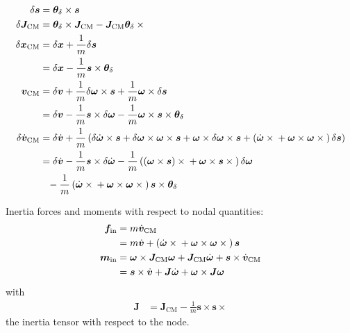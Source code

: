 \documentclass[10pt,fleqn,subeqn]{report}
\newcommand{\T}[1]{\bm{#1}}
\newcommand{\TT}[1]{\bm{#1}}
\begin{document}
\begin{subequations}
\begin{align}
	\delta\T{s}
		&= \T{\theta}_{\delta} \times \T{s} \\
	\delta \TT{J}_{\text{CM}}
		&= \T{\theta}_{\delta} \times \TT{J}_{\text{CM}}
		- \TT{J}_{\text{CM}} \T{\theta}_{\delta} \times{} \\
	\delta\T{x}_{\text{CM}}
		&= \delta\T{x} + \frac{1}{m} \delta\T{s}
		\nonumber \\
		&= \delta\T{x} - \frac{1}{m} \T{s} \times \T{\theta}_{\delta} \\
	\T{v}_{\text{CM}}
		&= \delta\T{v}
		+ \frac{1}{m} \delta\T{\omega} \times \T{s}
		+ \frac{1}{m} \T{\omega} \times \delta\T{s}
		\nonumber \\
		&= \delta\T{v}
		- \frac{1}{m} \T{s} \times \delta\T{\omega}
		- \frac{1}{m} \T{\omega} \times \T{s} \times \T{\theta}_{\delta} \\
	\delta\dot{\T{v}}_{\text{CM}}
		&= \delta\dot{\T{v}}
		+ \frac{1}{m}\plbr{
			\delta\dot{\T{\omega}}\times\T{s}
			+ \delta\T{\omega}\times\T{\omega}\times\T{s}
			+ \T{\omega}\times\delta\T{\omega}\times\T{s}
			+ \plbr{
				\dot{\T{\omega}}\times{}
				+ \T{\omega}\times\T{\omega}\times{}
			} \delta\T{s}
		}
		\nonumber \\
		&= \delta\dot{\T{v}}
			- \frac{1}{m} \T{s} \times \delta\dot{\T{\omega}}
			- \frac{1}{m} \plbr{
				\plbr{\T{\omega}\times\T{s}}\times{}
				+ \T{\omega}\times\T{s}\times{}
			} \delta\T{\omega}
		\nonumber \\ &\hphantom{=}
			- \frac{1}{m} \plbr{
				\dot{\T{\omega}}\times{}
				+ \T{\omega}\times\T{\omega}\times{}
			} \T{s}\times\T{\theta}_{\delta}
\end{align}
\end{subequations}

Inertia forces and moments with respect to nodal quantities:
\begin{subequations}
\begin{align}
	\T{f}_{\text{in}} &= m \dot{\T{v}}_{\text{CM}}
	\nonumber \\
	&=
	m \dot{\T{v}}
	+ \plbr{
		\dot{\T{\omega}} \times{}
		+ \T{\omega} \times \T{\omega} \times{}
	} \T{s} \\
	\T{m}_{\text{in}} &=
	\T{\omega} \times \TT{J}_{\text{CM}} \T{\omega}
	+ \TT{J}_{\text{CM}} \dot{\T{\omega}}
	+ \T{s} \times \dot{\T{v}}_{\text{CM}}
	\nonumber \\
	&= \T{s} \times \dot{\T{v}}
	+ \TT{J} \dot{\T{\omega}}
	+ \T{\omega} \times \TT{J} \T{\omega}
\end{align}
\end{subequations}
with
\begin{align}
	\TT{J} &= \TT{J}_{\text{CM}} - \frac{1}{m} \T{s} \times \T{s} \times{}
\end{align}
the inertia tensor with respect to the node.
\end{document}
